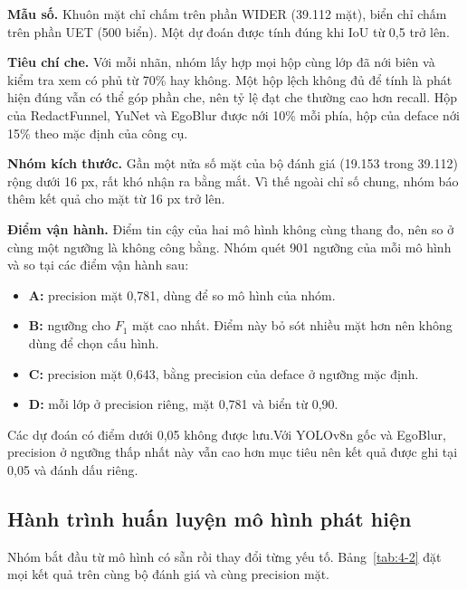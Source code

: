 \textbf{Mẫu số.} Khuôn mặt chỉ chấm trên phần WIDER (39.112 mặt), biển chỉ chấm trên phần UET (500 biển). Một dự đoán được tính đúng khi IoU từ 0,5 trở lên.

\textbf{Tiêu chí che.} Với mỗi nhãn, nhóm lấy hợp mọi hộp cùng lớp đã nới biên và kiểm tra xem có phủ từ 70\% hay không. Một hộp lệch không đủ để tính là phát hiện đúng vẫn có thể góp phần che, nên tỷ lệ đạt che thường cao hơn recall. Hộp của RedactFunnel, YuNet và EgoBlur được nới 10\% mỗi phía, hộp của deface nới 15\% theo mặc định của công cụ.

\textbf{Nhóm kích thước.} Gần một nửa số mặt của bộ đánh giá (19.153 trong 39.112) rộng dưới 16 px, rất khó nhận ra bằng mắt. Vì thế ngoài chỉ số chung, nhóm báo thêm kết quả cho mặt từ 16 px trở lên.

\textbf{Điểm vận hành.} Điểm tin cậy của hai mô hình không cùng thang đo, nên so ở cùng một ngưỡng là không công bằng. Nhóm quét 901 ngưỡng của mỗi mô hình và so tại các điểm vận hành sau:
\begin{itemize}
  \item \textbf{A:} precision mặt 0,781, dùng để so mô hình của nhóm.
  \item \textbf{B:} ngưỡng cho $F_1$ mặt cao nhất. Điểm này bỏ sót nhiều mặt hơn nên không dùng để chọn cấu hình.
  \item \textbf{C:} precision mặt 0,643, bằng precision của deface ở ngưỡng mặc định.
  \item \textbf{D:} mỗi lớp ở precision riêng, mặt 0,781 và biển từ 0,90.
\end{itemize}
Các dự đoán có điểm dưới 0,05 không được lưu.Với YOLOv8n gốc và EgoBlur, precision ở ngưỡng thấp nhất này vẫn cao hơn mục tiêu nên kết quả được ghi tại 0,05 và đánh dấu riêng.

\subsection{Hành trình huấn luyện mô hình phát hiện}

Nhóm bắt đầu từ mô hình có sẵn rồi thay đổi từng yếu tố. Bảng~\ref{tab:4-2} đặt mọi kết quả trên cùng bộ đánh giá và cùng precision mặt.

